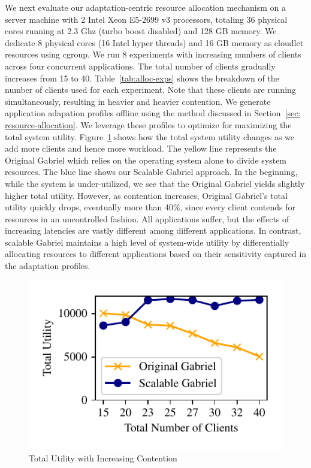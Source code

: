 We next evaluate our adaptation-centric resource allocation mechanism on a
server machine with 2 Intel{\textregistered} Xeon{\textregistered} E5-2699 v3
processors, totaling 36 physical cores running at 2.3 Ghz (turbo boost disabled)
and 128 GB memory. We dedicate 8 physical cores (16 Intel{\textregistered} hyper
threads) and 16 GB memory as cloudlet resources using cgroup. We run 8
experiments with increasing numbers of clients across four concurrent
applications. The total number of clients gradually increases from 15 to 40.
Table~\ref{tab:alloc-exps} shows the breakdown of the number of clients used for
each experiment. Note that these clients are running simultaneously, resulting
in heavier and heavier contention. We generate application adapation profiles
offline using the method discussed in Section~\ref{sec: resource-allocation}. We
leverage these profiles to optimize for maximizing the total system utility.
Figure~\ref{fig:alloc-max-util} shows how the total system utility changes as we
add more clients and hence more workload. The yellow line represents the
Original Gabriel which relies on the operating system alone to divide system
resources. The blue line shows our Scalable Gabriel approach. In the beginning,
while the system is under-utilized, we see that the Original Gabriel yields
slightly higher total utility. However, as contention increases, Original
Gabriel's total utility quickly drops, eventually more than 40\%, since every
client contends for resources in an uncontrolled fashion.  All applications
suffer, but the effects of increasing latencies are vastly different among
different applications. In contrast, scalable Gabriel maintains a high level of
system-wide utility by differentially allocating resources to different
applications based on their sensitivity captured in the adaptation profiles.

\begin{figure}[h]
  \centering
  \includegraphics[width=.9\linewidth]{FIGS/fig-alloc-max-util.pdf}
  \caption{Total Utility with Increasing Contention}
  \label{fig:alloc-max-util}
\end{figure}


